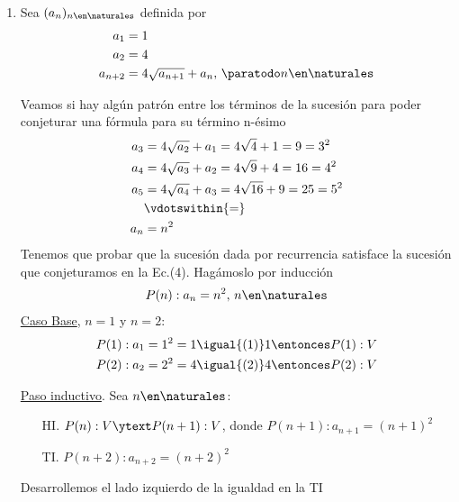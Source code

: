 \begin{enumerate}[label=\roman*)]
  \item Sea $(a_n)_{n \en \naturales }$ definida por
        \setcounter{equation}{0}
        \begin{align}
          a_1     & = 1                                                   \\
          a_2     & = 4                                                   \\
          a_{n+2} & = 4 \sqrt{a_{n+1}} + a_n,\, \paratodo n \en \naturales
        \end{align}

        Veamos si hay algún patrón entre los términos de la sucesión para poder conjeturar una fórmula para su término
        n-ésimo
        \begin{align}
          a_3 & = 4 \sqrt{a_2} + a_1 = 4 \sqrt{4} + 1 = 9 = 3^2 \nonumber   \\
          a_4 & = 4 \sqrt{a_3} + a_2 = 4 \sqrt{9} + 4 = 16 = 4^2 \nonumber  \\
          a_5 & = 4 \sqrt{a_4} + a_3 = 4 \sqrt{16} + 9 = 25 = 5^2 \nonumber \\
              & \vdotswithin{=} \nonumber                                   \\
          a_n & = n^2
        \end{align}
        Tenemos que probar que la sucesión dada por recurrencia satisface la sucesión que conjeturamos en la Ec.(4).
        Hagámoslo por inducción
        \begin{align*}
          P(n): a_n = n^2, \, n \en \naturales
        \end{align*}
        \underline{Caso Base}, $n = 1$ y $n = 2$:
        \begin{align*}
           & P(1): a_1 = 1^2 = 1 \igual{(1)} 1 \entonces P(1):V \\
           & P(2): a_2 = 2^2 = 4 \igual{(2)} 4 \entonces P(2):V \\
        \end{align*}

        \underline{Paso inductivo}. Sea $n \en \naturales $:

        \begin{enumerate}
          \item[HI.] $P(n):V  \ytext P(n+1):V$, donde $P(n+1): a_{n+1} = (n+1)^2$
          \item[TI.] $P(n+2): a_{n+2} = (n+2)^2$
        \end{enumerate}

        Desarrollemos el lado izquierdo de la igualdad en la TI


\end{enumerate}
